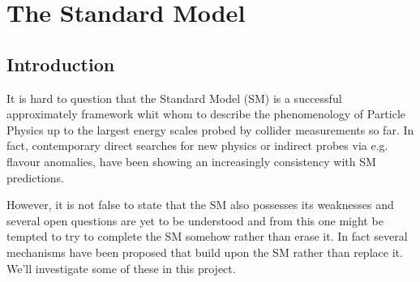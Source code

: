 \chapter{The Standard Model}
\label{ch:SM}

\section{Introduction}

It is hard to question that the Standard Model (SM) is a successful approximately framework whit whom to describe the phenomenology of Particle Physics up to the largest energy scales probed by collider measurements so far. In fact, contemporary direct searches for new physics or indirect probes via e.g. flavour anomalies, have been showing an increasingly consistency with SM predictions. 

However, it is not false to state that the SM also possesses its weaknesses and several open questions are yet to be understood and from this one might be tempted to try to complete the SM somehow rather than erase it. In fact several mechanisms have been proposed that build upon the SM rather than replace it. We'll investigate some of these in this project. 



